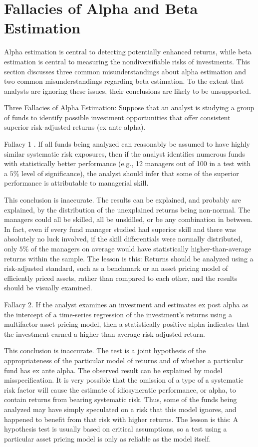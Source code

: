 \documentclass[11pt]{article}
\begin{document}
\section*{Fallacies of Alpha and Beta Estimation}
Alpha estimation is central to detecting potentially enhanced returns, while beta estimation is central to measuring the nondiversifiable risks of investments. This section discusses three common misunderstandings about alpha estimation and two common misunderstandings regarding beta estimation. To the extent that analysts are ignoring these issues, their conclusions are likely to be unsupported.

Three Fallacies of Alpha Estimation: Suppose that an analyst is studying a group of funds to identify possible investment opportunities that offer consistent superior risk-adjusted returns (ex ante alpha).

Fallacy 1 . If all funds being analyzed can reasonably be assumed to have highly similar systematic risk exposures, then if the analyst identifies numerous funds with statistically better performance (e.g., 12 managers out of 100 in a test with a $5 \%$ level of significance), the analyst should infer that some of the superior performance is attributable to managerial skill.

This conclusion is inaccurate. The results can be explained, and probably are explained, by the distribution of the unexplained returns being non-normal. The managers could all be skilled, all be unskilled, or be any combination in between. In fact, even if every fund manager studied had superior skill and there was absolutely no luck involved, if the skill differentials were normally distributed, only $5 \%$ of the managers on average would have statistically higher-than-average returns within the sample. The lesson is this: Returns should be analyzed using a risk-adjusted standard, such as a benchmark or an asset pricing model of efficiently priced assets, rather than compared to each other, and the results should be visually examined.

Fallacy 2. If the analyst examines an investment and estimates ex post alpha as the intercept of a time-series regression of the investment's returns using a multifactor asset pricing model, then a statistically positive alpha indicates that the investment earned a higher-than-average risk-adjusted return.

This conclusion is inaccurate. The test is a joint hypothesis of the appropriateness of the particular model of returns and of whether a particular fund has ex ante alpha. The observed result can be explained by model misspecification. It is very possible that the omission of a type of a systematic risk factor will cause the estimate of idiosyncratic performance, or alpha, to contain returns from bearing systematic risk. Thus, some of the funds being analyzed may have simply speculated on a risk that this model ignores, and happened to benefit from that risk with higher returns. The lesson is this: A hypothesis test is usually based on critical assumptions, so a test using a particular asset pricing model is only as reliable as the model itself.
\end{document}
